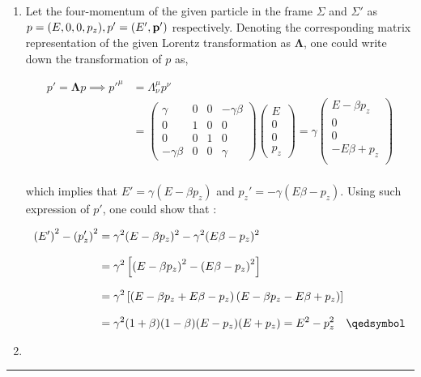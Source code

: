 \begin{solution}
    \begin{enumerate}[label=(\alph*)]   
        \item Let the four-momentum of the given particle in the frame $\Sigma$ and $\Sigma'$ as $p=(E,0,0,p_z),p'=(E',\mathbf{p}')$ respectively. Denoting the corresponding matrix representation of the given Lorentz transformation as $\boldsymbol{\Lambda}$, one could write down the transformation of $p$ as,
        
        \begin{align*}
            p' = \boldsymbol{\Lambda} p \implies p'^\mu &= \Lambda^{\mu}_\nu p^\nu \\[0.1in]
                   &= \begin{pmatrix}
                    \gamma       & 0 & 0 & -\gamma\beta \\
                    0            & 1 & 0 & 0            \\
                    0            & 0 & 1 & 0            \\
                    -\gamma\beta & 0 & 0 & \gamma      
                   \end{pmatrix}
                   \begin{pmatrix}
                    E \\
                    0 \\
                    0 \\
                    p_z 
                   \end{pmatrix} = \gamma
                   \begin{pmatrix}
                    E-\beta p_z \\ 0 \\ 0 \\ -E\beta +  p_z \\
                   \end{pmatrix} 
        \end{align*}\\
        which implies that $E' = \gamma \left( E-\beta p_z \right)$ and $p_z'=-\gamma(E\beta-p_z)$. Using such expression of $p'$, one could show that : 

        \begin{align*}
            \left(E'\right)^2 - \left(p_z'\right)^2 &= \gamma^2 (E-\beta p_z)^2 - \gamma^2 (E\beta - p_z)^2 \\[0.1in]
                                                    &= \gamma^2 \left[  \left( E-\beta p_z \right)^2 - \left(E\beta - p_z \right)^2 \right] \\[0.1in]
                                                    &= \gamma^2 \left[  \left( E-\beta p_z + E\beta - p_z \right) \left( E-\beta p_z - E\beta + p_z  \right) \right] \\[0.1in]
                                                    &= \gamma^2 (1+\beta)(1-\beta) (E-p_z)(E+p_z) = E^2 - p_z^2 \qed
        \end{align*}
        \item 
    \end{enumerate}
\end{solution} 
\noindent\rule{7in}{1.5pt}

